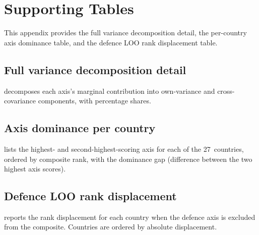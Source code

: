\section{Supporting Tables}\label{app:tables}

This appendix provides the full variance decomposition detail, the
per-country axis dominance table, and the defence LOO rank
displacement table.

\subsection{Full variance decomposition detail}

 decomposes each axis's marginal
contribution into own-variance and cross-covariance components, with
percentage shares.



\subsection{Axis dominance per country}

 lists the highest- and
second-highest-scoring axis for each of the 27~countries, ordered by
composite rank, with the dominance gap (difference between the two
highest axis scores).



\subsection{Defence LOO rank displacement}

 reports the rank displacement for each
country when the defence axis is excluded from the composite.
Countries are ordered by absolute displacement.



